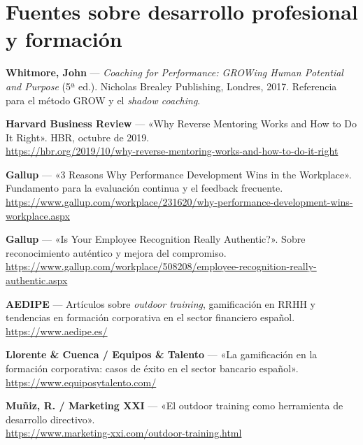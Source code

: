 \section*{Fuentes sobre desarrollo profesional y formación}

\begin{enumerate}[label={[\arabic*]}, resume]

  \item \textbf{Whitmore, John} --- \textit{Coaching for Performance: GROWing
        Human Potential and Purpose} (5ª ed.). Nicholas Brealey Publishing,
        Londres, 2017. Referencia para el método GROW y el \textit{shadow coaching}.

  \item \textbf{Harvard Business Review} --- «Why Reverse Mentoring Works and
        How to Do It Right». HBR, octubre de 2019.\\
        \url{https://hbr.org/2019/10/why-reverse-mentoring-works-and-how-to-do-it-right}

  \item \textbf{Gallup} --- «3 Reasons Why Performance Development Wins in the
        Workplace». Fundamento para la evaluación continua y el feedback frecuente.\\
        \url{https://www.gallup.com/workplace/231620/why-performance-development-wins-workplace.aspx}

  \item \textbf{Gallup} --- «Is Your Employee Recognition Really Authentic?».
        Sobre reconocimiento auténtico y mejora del compromiso.\\
        \url{https://www.gallup.com/workplace/508208/employee-recognition-really-authentic.aspx}

  \item \textbf{AEDIPE} --- Artículos sobre \textit{outdoor training},
        gamificación en RRHH y tendencias en formación corporativa en el
        sector financiero español.\\
        \url{https://www.aedipe.es/}

  \item \textbf{Llorente \& Cuenca / Equipos \& Talento} --- «La gamificación
        en la formación corporativa: casos de éxito en el sector bancario
        español».\\
        \url{https://www.equiposytalento.com/}

  \item \textbf{Muñiz, R. / Marketing XXI} --- «El outdoor training como
        herramienta de desarrollo directivo».\\
        \url{https://www.marketing-xxi.com/outdoor-training.html}

\end{enumerate}

